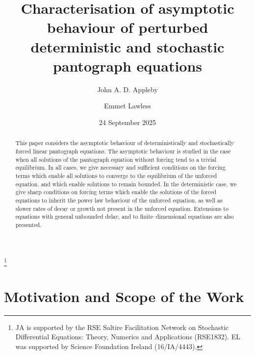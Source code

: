 \documentclass[a4paper,10pt,reqno]{amsart}
\numberwithin{equation}{section}
\theoremstyle{definition}
\theoremstyle{remark}
\DeclareMathOperator{\1}{\mathbbm 1}
\begin{document}
	
	\title[Asymptotic behaviour of pantograph equations]
	{Characterisation of asymptotic behaviour of perturbed deterministic and stochastic pantograph equations}
	
	\author{John A. D. Appleby}
	\address{School of Mathematical
		Sciences, Dublin City University, Glasnevin, Dublin 9, Ireland}
	
	\author{Emmet Lawless}
	\address{Department of Mathematics, 
		University of Michigan, 
		Ann Arbor, MI 48109-1043, U.S.A.}
	
	\thanks{JA is supported by the RSE Saltire Facilitation Network on Stochastic Differential Equations: Theory, Numerics and Applications (RSE1832). EL was supported by Science Foundation Ireland (16/IA/4443).} 
	\date{24 September 2025}
	
	\begin{abstract}
This paper considers the asymptotic behaviour of  deterministically and stochastically forced linear pantograph equations. The asymptotic behaviour is studied in the case when all solutions of the  pantograph equation without forcing tend to a trivial equilibrium. 
In all  cases, we  give necessary and sufficient conditions on the forcing terms which enable all solutions to converge to the equilibrium of the unforced equation, and which enable solutions to remain bounded. In the deterministic case, we give sharp conditions on forcing terms which enable the solutions of the forced equations to inherit the power law behaviour of the unforced equation, as well as slower rates of decay or growth not present in the unforced equation. Extensions to equations with general unbounded delay, and to finite--dimensional equations are also presented.
	\end{abstract}
	
	\maketitle
	
	\section{Motivation and Scope of the Work}
	\label{sec:2}
	
\end{document}
